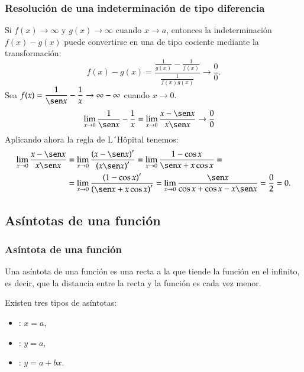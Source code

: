 \begin{frame}
\frametitle{Resolución de una indeterminación de tipo diferencia}
Si $f(x)\rightarrow \infty$ y $g(x)\rightarrow \infty$ cuando $x\rightarrow a$, entonces la indeterminación $f(x)-g(x)$ puede convertirse en una de tipo cociente mediante la transformación:
\[
f(x)-g(x)=\frac{\frac{1}{g(x)}-\frac{1}{f(x)}}{\frac{1}{f(x)g(x)}}\rightarrow \frac{0}{0}.
\]
 Sea $f(x)=\dfrac{1}{\sen x}-\dfrac{1}{x} \rightarrow \infty-\infty$ cuando $x\rightarrow 0$.
\begin{align*}
\lim_{x\rightarrow 0} \frac{1}{\sen x}-\frac{1}{x} &=
\lim_{x\rightarrow 0} \frac{x-\sen x}{x\sen x} \rightarrow \frac{0}{0}
\end{align*}
Aplicando ahora la regla de L´Hôpital tenemos:
\begin{align*}
\lim_{x\rightarrow 0} \frac{x-\sen x}{x\sen x} & =
\lim_{x\rightarrow 0} \frac{\left(x-\sen x\right)'}{\left(x\sen x\right)'}=
\lim_{x\rightarrow 0} \frac{1-\cos x}{\sen x +x\cos x} = \\
&= \lim_{x\rightarrow 0} \frac{\left(1-\cos x\right)'}{\left(\sen x +x\cos x\right)'} =
\lim_{x\rightarrow 0} \frac{\sen x}{\cos x +\cos x-x\sen x}=\frac{0}{2}=0.
\end{align*}
\end{frame}



\subsection{Asíntotas de una función}
\begin{frame}
\frametitle{Asíntota de una función}
Una asíntota de una función es una recta a la que tiende la función en el infinito, es decir, que la distancia entre la recta y la función es cada vez menor.

Existen tres tipos de asíntotas:
\begin{itemize}
\item {}: $x=a$,
\item {}: $y=a$,
\item {}: $y=a+bx$.
\end{itemize}
\end{frame}


